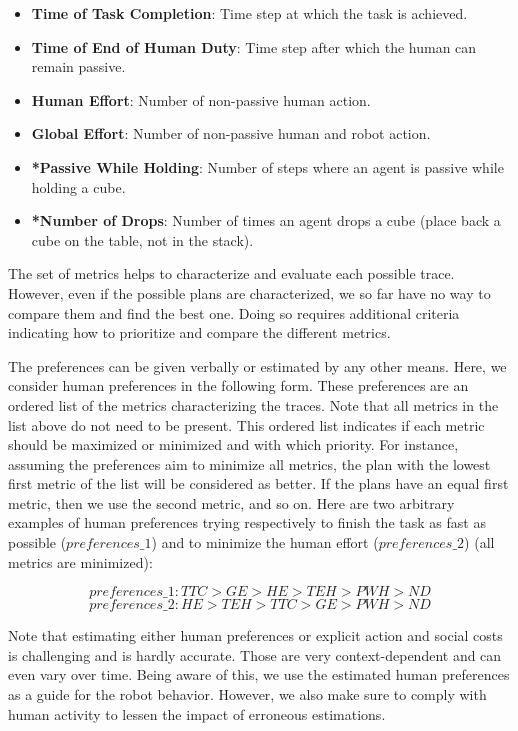 \begin{itemize}
    \item \textbf{Time of Task Completion}: Time step at which the task is achieved.
    \item \textbf{Time of End of Human Duty}: Time step after which the human can remain passive.
    \item \textbf{Human Effort}: Number of non-passive human action.
    \item \textbf{Global Effort}: Number of non-passive human and robot action.
    \item \textbf{*Passive While Holding}: Number of steps where an agent is passive while holding a cube.
    \item \textbf{*Number of Drops}: Number of times an agent drops a cube (place back a cube on the table, not in the stack).
\end{itemize}

The set of metrics helps to characterize and evaluate each possible trace. However, even if the possible plans are characterized, we so far have no way to compare them and find the best one. Doing so requires additional criteria indicating how to prioritize and compare the different metrics.

The preferences can be given verbally or estimated by any other means. Here, we consider human preferences in the following form. These preferences are an ordered list of the metrics characterizing the traces. Note that all metrics in the list above do not need to be present. This ordered list indicates if each metric should be maximized or minimized and with which priority. For instance, assuming the preferences aim to minimize all metrics, the plan with the lowest first metric of the list will be considered as better. If the plans have an equal first metric, then we use the second metric, and so on. Here are two arbitrary examples of human preferences trying respectively to finish the task as fast as possible ($preferences\_1$) and to minimize the human effort ($preferences\_2$) (all metrics are minimized):

\begin{equation*}
    preferences\_1: TTC > GE > HE > TEH > PWH > ND 
\end{equation*}
\begin{equation*}
    preferences\_2: HE > TEH > TTC > GE > PWH > ND 
\end{equation*}


Note that estimating either human preferences or explicit action and social costs is challenging and is hardly accurate. Those are very context-dependent and can even vary over time.
Being aware of this, we use the estimated human preferences as a guide for the robot behavior. However, we also make sure to comply with human activity to lessen the impact of erroneous estimations. 

